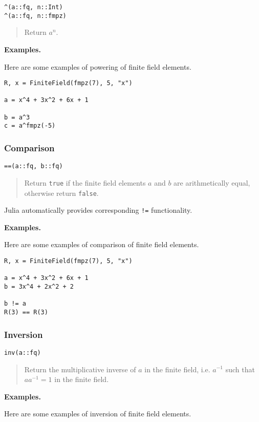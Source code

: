 \documentclass[a4paper,10pt]{article}
\newcommand{\code}{\lstinline}
\newcommand{\desc}[1]{\vspace{-3mm}\begin{quote}#1\end{quote}}
\begin{document}
{{\begin{lstlisting}
^(a::fq, n::Int)
^(a::fq, n::fmpz)
\end{lstlisting}

\desc{Return $a^n$.}

\textbf{Examples.}

Here are some examples of powering of finite field elements.

\begin{lstlisting}
R, x = FiniteField(fmpz(7), 5, "x")

a = x^4 + 3x^2 + 6x + 1

b = a^3
c = a^fmpz(-5)
\end{lstlisting}

\subsubsection{Comparison}

\begin{lstlisting}
==(a::fq, b::fq)
\end{lstlisting}

\desc{Return \code{true} if the finite field elements $a$ and $b$ are 
arithmetically equal, otherwise return \code{false}.}

Julia automatically provides corresponding \code{!=} functionality.

\textbf{Examples.}

Here are some examples of comparison of finite field elements.

\begin{lstlisting}
R, x = FiniteField(fmpz(7), 5, "x")

a = x^4 + 3x^2 + 6x + 1
b = 3x^4 + 2x^2 + 2

b != a
R(3) == R(3)
\end{lstlisting}

\subsubsection{Inversion}

\begin{lstlisting}
inv(a::fq)
\end{lstlisting}

\desc{Return the multiplicative inverse of $a$ in the finite field, i.e. 
$a^{-1}$ such that $aa^{-1} = 1$ in the finite field.}

\textbf{Examples.}

Here are some examples of inversion of finite field elements.

}}
\end{document}
